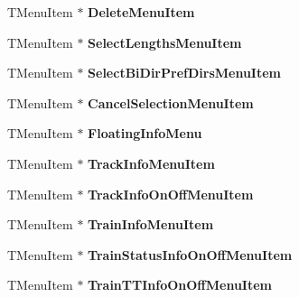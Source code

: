 \begin{DoxyCompactItemize}
\item 
\mbox{\label{class_t_interface_a8ad5f1db988eb5360b126b21fb9953ea}} 
T\+Menu\+Item $\ast$ {\bfseries Delete\+Menu\+Item}
\item 
\mbox{\label{class_t_interface_a605c84f7a0ab307cf5a16a4ab2dd89a5}} 
T\+Menu\+Item $\ast$ {\bfseries Select\+Lengths\+Menu\+Item}
\item 
\mbox{\label{class_t_interface_a1ac4134f6658c7f6de09ef354c0ccac8}} 
T\+Menu\+Item $\ast$ {\bfseries Select\+Bi\+Dir\+Pref\+Dirs\+Menu\+Item}
\item 
\mbox{\label{class_t_interface_adfbb51de41895e146c88bb433fde97ba}} 
T\+Menu\+Item $\ast$ {\bfseries Cancel\+Selection\+Menu\+Item}
\item 
\mbox{\label{class_t_interface_a57d5981fe7fe4db9507c583c3e23b438}} 
T\+Menu\+Item $\ast$ {\bfseries Floating\+Info\+Menu}
\item 
\mbox{\label{class_t_interface_a0804441af6dc023b354d44db8c522355}} 
T\+Menu\+Item $\ast$ {\bfseries Track\+Info\+Menu\+Item}
\item 
\mbox{\label{class_t_interface_a488b2a94eab5b7230ed5d1051a16dc50}} 
T\+Menu\+Item $\ast$ {\bfseries Track\+Info\+On\+Off\+Menu\+Item}
\item 
\mbox{\label{class_t_interface_a0dad638d76e7d41275684714e362cf43}} 
T\+Menu\+Item $\ast$ {\bfseries Train\+Info\+Menu\+Item}
\item 
\mbox{\label{class_t_interface_a3741de0fd2f1f04f5e87a207d9d1b78a}} 
T\+Menu\+Item $\ast$ {\bfseries Train\+Status\+Info\+On\+Off\+Menu\+Item}
\item 
\mbox{\label{class_t_interface_a233d28374dbeb6b15dccb6a2dee424b9}} 
T\+Menu\+Item $\ast$ {\bfseries Train\+T\+T\+Info\+On\+Off\+Menu\+Item}
\item 
\mbox{\label{class_t_interface_a9b19287e66aae03a6673d5442950c32a}} 

\end{DoxyCompactItemize}
